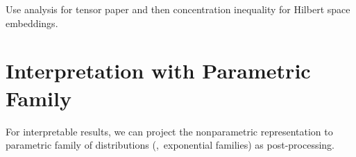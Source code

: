 \documentclass[11pt]{article}
\begin{document}
Use analysis for tensor paper and then concentration inequality for Hilbert space embeddings.

\section{Interpretation with Parametric Family}

For interpretable results, we can project the nonparametric representation to parametric family of distributions (\eg,~exponential families) as post-processing.




\end{document}
